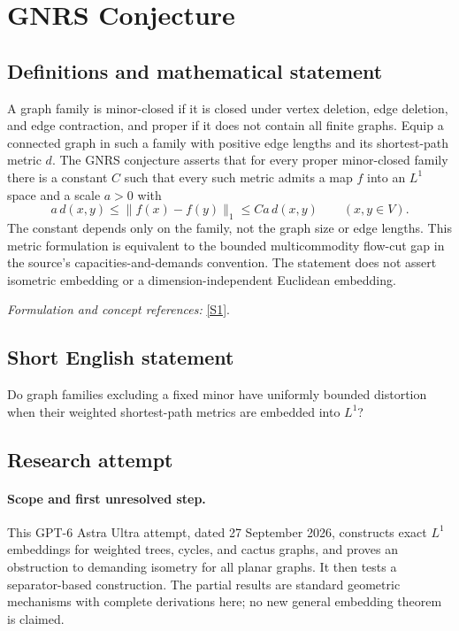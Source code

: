 \documentclass[11pt]{article}
\begin{document}
\section*{\texorpdfstring{GNRS Conjecture}{GNRS Conjecture}}\label{statement}
\subsection{Definitions and mathematical statement}
A graph family is minor-closed if it is closed under vertex deletion, edge deletion, and edge contraction, and proper if it does not contain all finite graphs. Equip a connected graph in such a family with positive edge lengths and its shortest-path metric $d$. The GNRS conjecture asserts that for every proper minor-closed family there is a constant $C$ such that every such metric admits a map $f$ into an $L^1$ space and a scale $a>0$ with
\[
 a\,d(x,y)\le\|f(x)-f(y)\|_1\le C a\,d(x,y)
 \qquad(x,y\in V).
\]
The constant depends only on the family, not the graph size or edge lengths. This metric formulation is equivalent to the bounded multicommodity flow-cut gap in the source's capacities-and-demands convention. The statement does not assert isometric embedding or a dimension-independent Euclidean embedding.
\par\smallskip\textit{Formulation and concept references:} \href{https://arxiv.org/html/2111.07974v1}{[S1]}.

\subsection{Short English statement}
Do graph families excluding a fixed minor have uniformly bounded distortion when their weighted shortest-path metrics are embedded into $L^1$?
\subsection{Research attempt}
\paragraph{Scope and first unresolved step.}
This GPT-6 Astra Ultra attempt, dated 27 September 2026, constructs exact $L^1$ embeddings for weighted trees, cycles, and cactus graphs, and proves an obstruction to demanding isometry for all planar graphs. It then tests a separator-based construction. The partial results are standard geometric mechanisms with complete derivations here; no new general embedding theorem is claimed.
\end{document}
